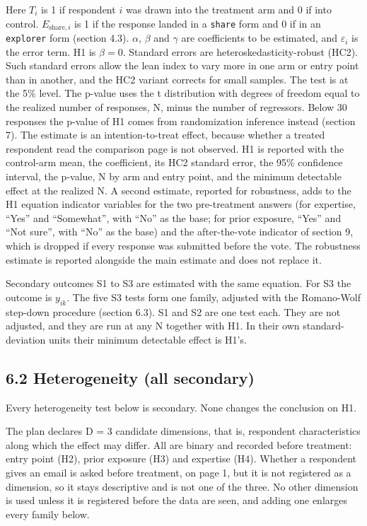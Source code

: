 Here \(T_i\) is 1 if respondent \(i\) was drawn into the treatment arm and 0 if into control.
\(E_{\mathrm{share},i}\) is 1 if the response landed in a \texttt{share} form and 0 if in an \texttt{explorer} form
(section 4.3). \(\alpha\), \(\beta\) and \(\gamma\) are coefficients to be estimated, and \(\varepsilon_i\) is
the error term. H1 is \(\beta = 0\). Standard errors are heteroskedasticity-robust (HC2). Such standard
errors allow the lean index to vary more in one arm or entry point than in another, and the HC2
variant corrects for small samples. The test is at the 5\% level. The p-value uses the t
distribution with degrees of freedom equal to the realized number of responses, N, minus the number
of regressors. Below 30 responses the p-value of H1 comes from randomization inference instead
(section 7). The estimate is an intention-to-treat effect, because whether a treated respondent
read the comparison page is not observed. H1 is reported with the control-arm mean, the
coefficient, its HC2 standard error, the 95\% confidence interval, the p-value, N by arm and entry
point, and the minimum detectable effect at the realized N. A second estimate, reported for
robustness, adds to the H1 equation indicator variables for the two pre-treatment answers (for
expertise, ``Yes'' and ``Somewhat'', with ``No'' as the base; for prior exposure, ``Yes'' and ``Not sure'',
with ``No'' as the base) and the after-the-vote indicator of section 9, which is dropped if every
response was submitted before the vote. The robustness estimate is reported alongside the main
estimate and does not replace it.

Secondary outcomes S1 to S3 are estimated with the same equation. For S3 the outcome is \(y_{ik}\).
The five S3 tests form one family, adjusted with the Romano-Wolf step-down procedure (section
6.3). S1 and S2 are one
test each. They are not adjusted, and they are run at any N together with H1. In their own
standard-deviation units their minimum detectable effect is H1's.

\subsection{6.2 Heterogeneity (all secondary)}\label{heterogeneity-all-secondary}

Every heterogeneity test below is secondary. None changes the conclusion on H1.

The plan declares D = 3 candidate dimensions, that is, respondent characteristics along which the
effect may differ. All are binary and recorded before treatment: entry point (H2), prior exposure
(H3) and expertise (H4). Whether a respondent gives an email is asked
before treatment, on page 1, but it is not registered as a dimension, so it stays descriptive and
is not one of the three. No other dimension is used
unless it is registered before the data are seen, and adding one enlarges every family below.

